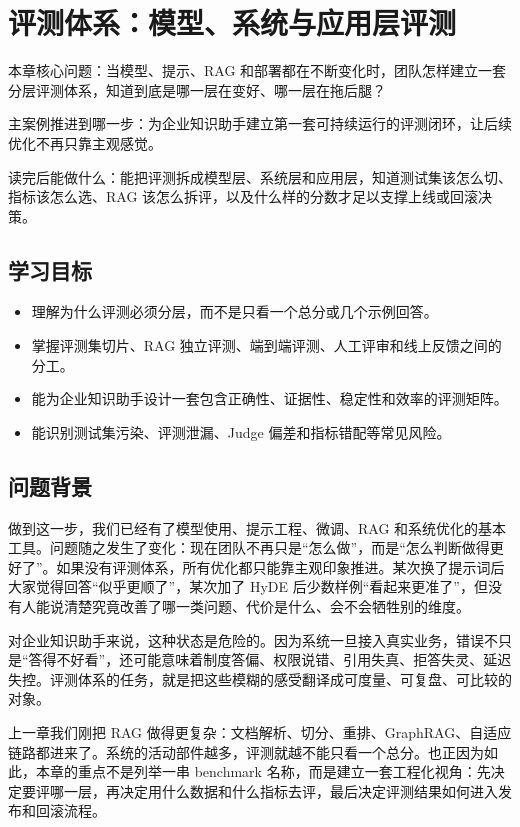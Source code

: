\chapter{评测体系：模型、系统与应用层评测}

\begin{introduction}
\item {\heiti 本章核心问题}：当模型、提示、RAG 和部署都在不断变化时，团队怎样建立一套分层评测体系，知道到底是哪一层在变好、哪一层在拖后腿？
\item {\heiti 主案例推进到哪一步}：为企业知识助手建立第一套可持续运行的评测闭环，让后续优化不再只靠主观感觉。
\item {\heiti 读完后能做什么}：能把评测拆成模型层、系统层和应用层，知道测试集该怎么切、指标该怎么选、RAG 该怎么拆评，以及什么样的分数才足以支撑上线或回滚决策。
\end{introduction}

\section{学习目标}
\begin{itemize}
  \item 理解为什么评测必须分层，而不是只看一个总分或几个示例回答。
  \item 掌握评测集切片、RAG 独立评测、端到端评测、人工评审和线上反馈之间的分工。
  \item 能为企业知识助手设计一套包含正确性、证据性、稳定性和效率的评测矩阵。
  \item 能识别测试集污染、评测泄漏、Judge 偏差和指标错配等常见风险。
\end{itemize}

\section{问题背景}
做到这一步，我们已经有了模型使用、提示工程、微调、RAG 和系统优化的基本工具。问题随之发生了变化：现在团队不再只是“怎么做”，而是“怎么判断做得更好了”。如果没有评测体系，所有优化都只能靠主观印象推进。某次换了提示词后大家觉得回答“似乎更顺了”，某次加了 HyDE 后少数样例“看起来更准了”，但没有人能说清楚究竟改善了哪一类问题、代价是什么、会不会牺牲别的维度。

对企业知识助手来说，这种状态是危险的。因为系统一旦接入真实业务，错误不只是“答得不好看”，还可能意味着制度答偏、权限说错、引用失真、拒答失灵、延迟失控。评测体系的任务，就是把这些模糊的感受翻译成可度量、可复盘、可比较的对象。

上一章我们刚把 RAG 做得更复杂：文档解析、切分、重排、GraphRAG、自适应链路都进来了。系统的活动部件越多，评测就越不能只看一个总分。也正因为如此，本章的重点不是列举一串 benchmark 名称，而是建立一套工程化视角：先决定要评哪一层，再决定用什么数据和什么指标去评，最后决定评测结果如何进入发布和回滚流程。

